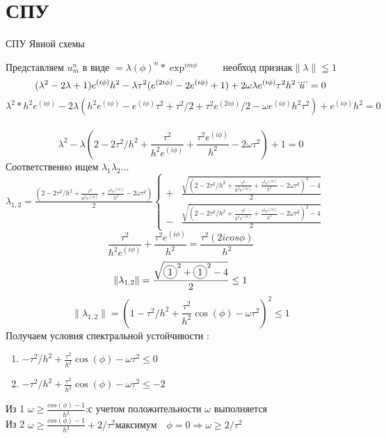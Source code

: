 \documentclass[12pt,eqnleft,executivepaper]{article}
\newcommand*\circled[1]{\tikz[baseline=(char.base)]{%
\node[shape=circle,draw,inner sep=2pt](char){#1};}}
\begin{document}
\section[Устойчивость]{СПУ}	\begin{center} \color{green}СПУ Явной схемы\\	\end{center} 
Представляем $u_m^n \text{ в виде  }= \lambda(\phi)^n*\exp^{i m\phi} \qquad\text{ необход признак}  \| \lambda \|\leqq 1$\\
$$ (\lambda^2-2\lambda+1)e^{(i \phi)}h^2-\lambda \tau^2(e^{(2i \phi)}-2e^{(i \phi)}+1)+2\omega \lambda e^{(i \phi)} \tau^2 h^2\ddddot u =0\\$$
$$\lambda^2*h^2e^{(i \phi)}-2\lambda(h^2e^{(i \phi)}-e^{(i \phi)} \tau^2+\tau^2/2+\tau^2e^{(2i \phi)}/2-\omega e^{(i \phi)} h^2\tau^2)+e^{(i \phi)}h^2 =0$$\\
$$\lambda^2-\lambda(2- 2\tau^2/h^2+\frac{\tau^2}{h^2 e^{(i \phi)}}+\frac{\tau^2 e^{(i \phi)}}{h^2}-2\omega \tau^2)+1 =0$$
Соответственно ищем  $ \lambda_1 \lambda_2\ldots$\\
$\lambda_{1,2}=\frac{(2- 2\tau^2/h^2+\frac{\tau^2}{h^2 e^{(i \phi)}}+\frac{\tau^2e^{(i \phi)}}{h^2}-2\omega \tau^2)}{2}
\begin{cases}
+&\frac{\sqrt{(2- 2\tau^2/h^2+\frac{\tau^2}{h^2 e^{(i \phi)}}+\frac{\tau^2 e^{(i \phi)}}{h^2}-2\omega \tau^2)^2-4}}{2}\\
-&\frac{\sqrt{(2- 2\tau^2/h^2+\frac{\tau^2}{h^2 e^{(i \phi)}}+\frac{\tau^2 e^{(i \phi)}}{h^2}-2\omega \tau^2)^2-4}}{2}
\end{cases}$
$$\frac{\tau^2}{h^2 e^{(i \phi)}}+\frac{\tau^2e^{(i \phi)}}{h^2}=\frac{\tau^2(2icos{\phi})}{h^2}$$
$$\|\lambda_{1,2}\|=\frac{\sqrt{\circled{1}^2+\circled{1}^2-4}}{2}\leq1$$
$$\|\lambda_{1,2}\|=(1- \tau^2/h^2+\frac{\tau^2}{h^2}\cos(\phi)-\omega \tau^2)^2\leq 1$$
Получаем условия спектральной устойчивости :\\
\begin{enumerate}
\item$ -\tau^2/h^2+\frac{\tau^2}{h^2}\cos(\phi)-\omega \tau^2\leq0$\\
\item$  -\tau^2/h^2+\frac{\tau^2}{h^2}\cos(\phi)-\omega \tau^2\leq-2$\\
\end{enumerate}
Из 1 $\omega \geq \frac{cos(\phi)-1}{h^2} $:с учетом положительности $ \omega$ выполняется\\
Из 2 $\omega \geq \frac{cos(\phi)-1}{h^2}+2/\tau^2\text{максимум}\quad \phi=0 \Rightarrow \omega \geq 2/\tau^2$\\
\end{document}
